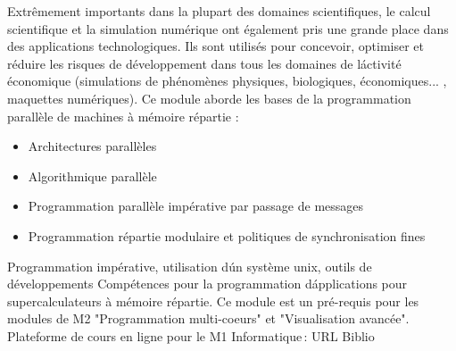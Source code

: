 {
Extrêmement importants dans la plupart des domaines scientifiques, le calcul scientifique et la simulation numérique ont également pris une grande place dans des applications technologiques. Ils sont utilisés pour concevoir, optimiser et réduire les risques de développement dans tous les domaines de l\'activité économique (simulations de phénomènes physiques, biologiques, économiques... , maquettes numériques). Ce module aborde les bases de la programmation parallèle de machines à mémoire répartie :
\begin{itemize}
\item Architectures parallèles
\item Algorithmique parallèle
\item Programmation parallèle impérative par passage de messages
\item Programmation répartie modulaire et politiques de synchronisation fines
\end{itemize}
} 
{Programmation impérative, utilisation d\'un système unix, outils de développements
} 
{Compétences pour la programmation d\'applications pour supercalculateurs à mémoire répartie.
Ce module est un pré-requis pour les modules de M2 "Programmation multi-coeurs" et "Visualisation avancée". 
} 
{Plateforme de cours en ligne pour le M1 Informatique\,: URL} 
{Biblio} 
 
\vfill

